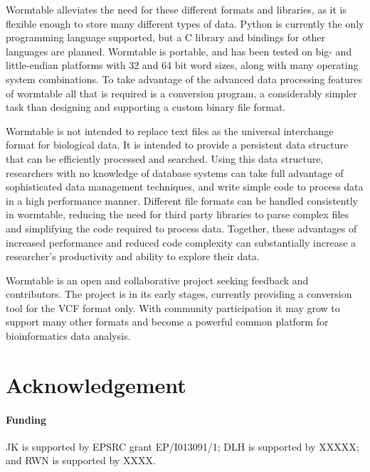 \documentclass{bioinfo}
\begin{document}
Wormtable alleviates the need for these different formats and libraries,
as it is flexible enough to store many different types of data. Python 
is currently the only programming language supported, but a C library
and bindings for other languages are planned. Wormtable is portable,
and has been tested on big- and little-endian platforms with 32 and 64
bit word sizes, along with many operating system combinations. To 
take advantage of the advanced data processing features of wormtable
all that is required is a conversion program, a considerably simpler
task than designing and supporting a custom binary file format.

Wormtable is not intended to replace text files as the universal 
interchange format for biological data. 
It is intended to provide a persistent data structure 
that can be efficiently processed 
and searched. Using this data structure, researchers with no knowledge of 
database systems can take full advantage of sophisticated 
data management techniques, and write simple code to process 
data in a high performance manner. 
Different file formats can be handled consistently 
in wormtable, reducing the need for third party libraries 
to parse complex files and simplifying the code required 
to process data.
Together, these advantages of increased performance and reduced 
code complexity can substantially increase a researcher's 
productivity and ability to explore their data.

Wormtable is an open and collaborative project seeking feedback and 
contributors. The project is in its early stages, currently 
providing a conversion tool for the VCF format only. With community
participation it may grow to support many other formats and become
a powerful common platform for bioinformatics data analysis.

\section*{Acknowledgement}
\paragraph{Funding\textcolon}  
JK is supported by EPSRC grant EP/I013091/1; DLH is supported by XXXXX; 
and RWN is supported by XXXX.



\end{document}
